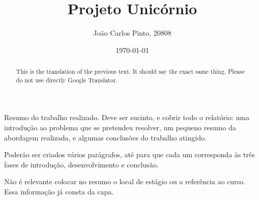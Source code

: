 \documentclass[a4paper,12pt,twoside]{book}
\title{Projeto Unicórnio}
\author{João Carlos Pinto, 20808}
\date{\today}
\begin{document}



\frontmatter
\maketitle  %

\begin{resumo}
Resumo do trabalho realizado. Deve ser sucinto, e cobrir todo o relatório: uma introdução ao problema que se pretendeu resolver, um pequeno resumo da abordagem realizada, e algumas conclusões do trabalho atingido.

Poderão ser criados vários parágrafos, até para que cada um corresponda às três fases de introdução, desenvolvimento e conclusão.

Não é relevante colocar no resumo o local de estágio ou a referência ao curso. Essa informação já consta da capa.
\end{resumo}

\begin{abstract}
This is the translation of the previous text. It should say the exact same thing. Please do not use directly Google Translator.
\end{abstract}

\begin{agradecimentos}
\end{agradecimentos}

\tableofcontents

\listoffigures
{}

\listoftables
{}

\mainmatter






\lstlistoflistings
{}

\printglossary[type=\acronymtype,title={Siglas \& Acrónimos},toctitle={Siglas \& Acrónimos}]

\printglossary[title={Indice de Termos},toctitle={Indice de Termos}]


\end{document}
